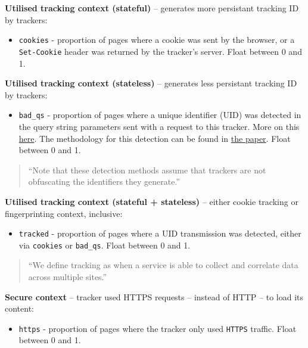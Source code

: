 \documentclass[
]{article}
\providecommand{\tightlist}{%
  \setlength{\itemsep}{0pt}\setlength{\parskip}{0pt}}
\begin{document}
\textbf{Utilised tracking context (stateful)} -- generates more
persistant tracking ID by trackers:

\begin{itemize}
\tightlist
\item
  \texttt{cookies} - proportion of pages where a cookie was sent by the
  browser, or a \texttt{Set-Cookie} header was returned by the tracker's
  server. Float between 0 and 1.
\end{itemize}

\textbf{Utilised tracking context (stateless)} -- generates less
persistant tracking ID by trackers:

\begin{itemize}
\tightlist
\item
  \texttt{bad\_qs} - proportion of pages where a unique identifier (UID)
  was detected in the query string parameters sent with a request to
  this tracker. More on this \href{https://bit.ly/2RWGkyT}{here}. The
  methodology for this detection can be found in
  \href{https://bit.ly/32Qa86H}{the paper}. Float between 0 and 1.
\end{itemize}

\begin{quote}
``Note that these detection methods assume that trackers are not
obfuscating the identifiers they generate.''
\end{quote}

\textbf{Utilised tracking context (stateful + stateless)} -- either
cookie tracking or fingerprinting context, inclusive:

\begin{itemize}
\tightlist
\item
  \texttt{tracked} - proportion of pages where a UID transmission was
  detected, either via \texttt{cookies} or \texttt{bad\_qs}. Float
  between 0 and 1.
\end{itemize}

\begin{quote}
``We define tracking as when a service is able to collect and correlate
data across multiple sites.''
\end{quote}

\newpage

\textbf{Secure context} -- tracker used HTTPS requests -- instead of
HTTP -- to load its content:

\begin{itemize}
\tightlist
\item
  \texttt{https} - proportion of pages where the tracker only used
  \texttt{HTTPS} traffic. Float between 0 and 1.
\end{itemize}
\end{document}
